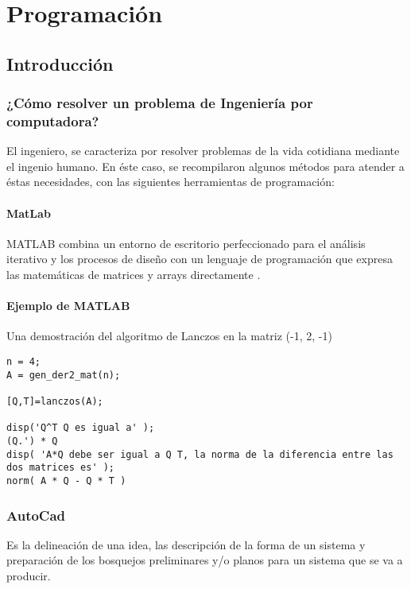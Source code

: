 \chapter{Programación}


\section{Introducción}

\subsection{¿Cómo resolver un problema de Ingeniería por computadora?}

El ingeniero, se caracteriza por resolver problemas de la vida cotidiana mediante el ingenio humano. En éste caso, se recompilaron algunos métodos para atender a éstas necesidades, con las siguientes herramientas de programación:

\subsubsection{MatLab}

MATLAB combina un entorno de escritorio perfeccionado para el análisis iterativo y los procesos de diseño con un lenguaje de programación que expresa las matemáticas de matrices y arrays directamente \autocite{holly2007matlab}.

\subsubsection{Ejemplo de MATLAB}

Una demostración del algoritmo de Lanczos en la matriz (-1, 2, -1)

    \begin{lstlisting}[style=matlabFrameTB, gobble=4]
n = 4; 
A = gen_der2_mat(n); 

[Q,T]=lanczos(A);

disp('Q^T Q es igual a' ); 
(Q.') * Q 
disp( 'A*Q debe ser igual a Q T, la norma de la diferencia entre las dos matrices es' ); 
norm( A * Q - Q * T )
    \end{lstlisting}

\subsection{AutoCad}

\begin{definition}[Diseño]
  Es la delineación de una idea, las descripción de la forma de un sistema y preparación de los bosquejos preliminares y/o planos para un sistema que se va a producir.
\end{definition}


